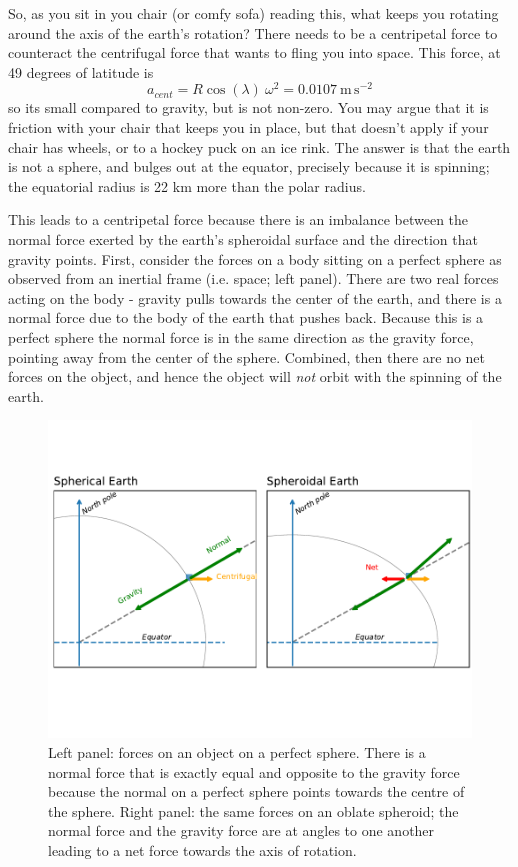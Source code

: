So, as you sit in you chair (or comfy sofa) reading this, what keeps you rotating around the axis of the earth's rotation?  There needs to be a centripetal force to counteract the centrifugal force that wants to fling you into space.  This force, at 49 degrees of latitude is 
\begin{equation}
    a_{cent} = R\cos\left(\lambda\right)\ \omega^2 = 0.0107 \ \mathrm{m\,s^{-2}}    
\end{equation}
so its small compared to gravity, but is not non-zero.  You may argue that it is friction with your chair that keeps you in place, but that doesn't apply if your chair has wheels, or to a hockey puck on an ice rink.  The answer is that the earth is not a sphere, and bulges out at the equator, precisely because it is spinning; the equatorial radius is 22 km more than the polar radius. 

This leads to a centripetal force because there is an imbalance between the normal force exerted by the earth's spheroidal surface and the direction that gravity points.  First, consider the forces on a body sitting on a perfect sphere as observed from an inertial frame (i.e. space;  left panel).  There are two real forces acting on the body - gravity pulls towards the center of the earth, and there is a normal force due to the body of the earth that pushes back.  Because this is a perfect sphere the normal force is in the same direction as the gravity force, pointing away from the center of the sphere.  Combined, then there are no net forces on the object, and hence the object will \emph{not} orbit with the spinning of the earth.  

\begin{figure}[hbt]
  \begin{center}
    \includegraphics{figs/Coriolis/CentrEarth}
    \caption{Left panel: forces on an object on a perfect sphere.  There is a normal force that is exactly equal and opposite to the gravity force because the normal on a perfect sphere points towards the centre of the sphere.  Right panel: the same forces on an oblate spheroid; the normal force and the gravity force are at angles to one another leading to a net force towards the axis of rotation.}
    \label{fig:CentrEarth}  
  \end{center}
\end{figure}

